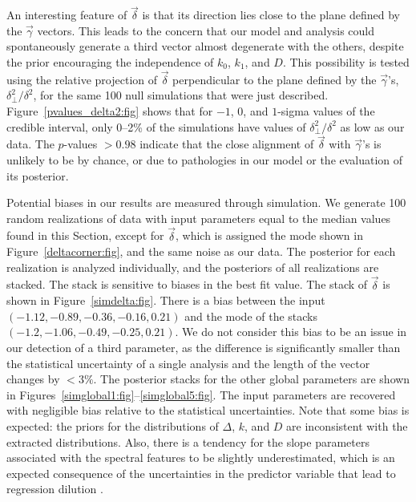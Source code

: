 \documentclass{aastex61}   	%
\begin{document}
An interesting feature of $\vec{\delta}$ is that its direction lies close to the plane defined by the
$\vec{\gamma}$ vectors.
This leads to the concern that our model and analysis  could spontaneously generate a third
vector almost degenerate with the others, despite the prior 
encouraging
 the independence of $k_0$, $k_1$, and $D$.
This
possibility
 is tested using the 
relative projection of $\vec{\delta}$  perpendicular to the plane defined by the $\vec{\gamma}$'s, $\delta_\perp^2/\delta^2$,
for the same 100 null simulations that were just described.
Figure~\ref{pvalues_delta2:fig} shows  that for 
 $-1$, 0, and $1$-sigma
values of  the credible interval, only 0--2\% of the simulations have values of  $\delta_\perp^2/\delta^2$ as low as our data.
The $p$-values $>0.98$ indicate that 
 the close alignment of $\vec{\delta}$  with  $\vec{\gamma}$'s is unlikely to be by chance,
\color{red}
or due to pathologies in our model or the evaluation of its posterior.
\color{black}


Potential biases in our results are measured through simulation.
We generate 100 random realizations of data with input  parameters equal to the median values found in
this Section, except for $\vec{\delta}$, which is assigned
the mode shown in Figure~\ref{deltacorner:fig},
and the same noise as our data.  The posterior for each realization is analyzed individually, and the posteriors of all realizations are stacked.  The stack is sensitive to
biases in the best fit value.
The stack of  $\vec{\delta}$  is shown in Figure~\ref{simdelta:fig}.  There is a bias between
the input  $(-1.12, -0.89, -0.36,  -0.16, 0.21)$ and the mode of  the stacks $(-1.2, -1.06, -0.49, -0.25, 0.21)$.
We do not consider this bias to be an issue in our detection of a third parameter, as the difference is significantly
smaller than the statistical uncertainty of a single analysis and the length of the vector changes by $< 3\%$.
The posterior stacks for the other global parameters 
are shown in Figures~\ref{simglobal1:fig}--\ref{simglobal5:fig}.  The input parameters are recovered with negligible bias
relative to the statistical uncertainties. 
Note that some bias is expected: the priors for the distributions of $\Delta$, $k$, and $D$ are inconsistent
with the extracted distributions.  Also, 
there is a tendency for the slope parameters associated with the spectral features to be slightly underestimated, which is an expected consequence of 
the uncertainties in the predictor variable that lead to 
regression dilution \citep{spearman04}.
\end{document}
